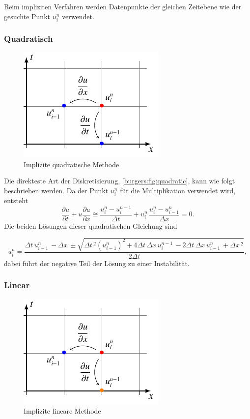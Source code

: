 	Beim impliziten Verfahren werden Datenpunkte der gleichen Zeitebene wie der gesuchte Punkt $u_{i}^{n}$ verwendet.


\subsubsection{Quadratisch}
     \begin{figure}
	\centering
	\includegraphics[height=.4\textwidth]{papers/burgers/BurgersEquation/tikz/quadratic/quadratic.pdf}
	\caption{Implizite quadratische Methode}
	\label{burgers:fig:quadratic}
	\end{figure}

	Die direkteste Art der Diskretisierung, \autoref{burgers:fig:quadratic}, kann wie folgt beschrieben werden.
	Da der Punkt $u_{i}^{n}$ f\"ur die Multiplikation verwendet wird, entsteht
	\begin{equation}
	\frac {\partial u}{\partial t}+u{\frac {\partial u}{\partial x}} \cong \frac{u_{i}^{n}-u_{i}^{n-1}}{\Delta t}+ u_{i}^{n}\, \frac{u_{i}^{n}-u_{i-1}^{n}}{\Delta x}=0.
	\end{equation}
	Die beiden L\"osungen dieser quadratischen Gleichung sind

	\begin{equation}
	  u_{i}^{n} =
	     \dfrac{\Delta{t}\, u^{n}_{i-1}\, - \Delta{x}\, \pm \sqrt{\Delta{t}\,^{2} (u^{n}_{i-1})^{2} + 4 \Delta{t}\, \Delta{x}\, u^{n-1}_{i}\, - 2 \Delta{t}\, \Delta{x}\, u^{n}_{i-1}\, + \Delta{x}\,^{2}}}{2 \Delta{t}},
	\end{equation}
	dabei f\"uhrt der negative Teil der L\"osung zu einer Instabilität.


	\subsubsection{Linear}
	\label{burgers:sec:imp_lin}
	     \begin{figure}
		\centering
		\includegraphics[height=.4\textwidth]{papers/burgers/BurgersEquation/tikz/linear5/linear5.pdf}
		\caption{Implizite lineare Methode}
		\label{burgers:fig:linear5}
		\end{figure}

